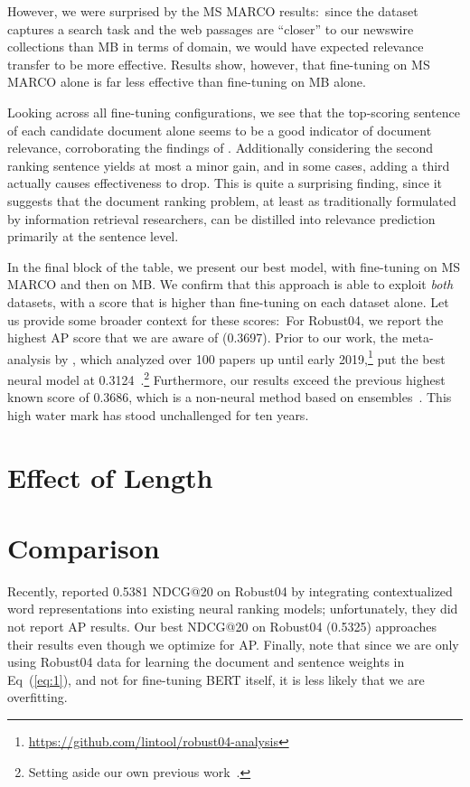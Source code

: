 However, we were surprised by the MS MARCO results:\
since the dataset captures a search task and the web passages are ``closer'' to our newswire collections than MB in terms of domain, we would have expected relevance transfer to be more effective.
Results show, however, that fine-tuning on MS MARCO alone is far less effective than fine-tuning on MB alone.

Looking across all fine-tuning configurations, we see that the top-scoring sentence of each candidate document alone seems to be a good indicator of document relevance, corroborating the findings of \cite{}.
Additionally considering the second ranking sentence yields at most a minor gain, and in some cases, adding a third actually causes effectiveness to drop.
This is quite a surprising finding, since it suggests that the document ranking problem, at least as traditionally formulated by information retrieval researchers, can be distilled into relevance prediction primarily at the sentence level.

In the final block of the table, we present our best model, with fine-tuning on MS MARCO and then on MB.
We confirm that this approach is able to exploit {\it both} datasets, with a score that is higher than fine-tuning on each dataset alone.
Let us provide some broader context for these scores:\
For Robust04, we report the highest AP score that we are aware of (0.3697).
Prior to our work, the meta-analysis by \cite{}, which analyzed over 100 papers up until early 2019,\footnote{\url{https://github.com/lintool/robust04-analysis}} put the best neural model at 0.3124~\cite{}.\footnote{Setting aside our own previous work~\cite{yang2019simple}.}
Furthermore, our results exceed the previous highest known score of 0.3686, which is a non-neural method based on ensembles~\cite{Cormack:2009:RRF:1571941.1572114}.
This high water mark has stood unchallenged for ten years.


\section{Effect of Length}

\section{Comparison}

Recently, \cite{MacAvaney_etal_SIGIR2019} reported 0.5381 NDCG@20 on Robust04 by integrating contextualized word representations into existing neural ranking models; unfortunately, they did not report AP results.
Our best NDCG@20 on \mbox{Robust04} (0.5325) approaches their results even though we optimize for AP.
Finally, note that since we are only using Robust04 data for learning the document and sentence weights in Eq~(\ref{eq:1}), and not for fine-tuning BERT itself, it is less likely that we are overfitting.

